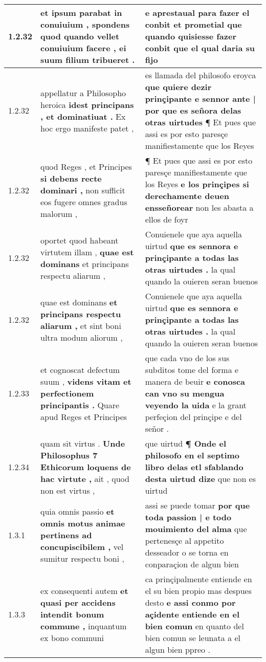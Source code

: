 \begin{tabular}{|p{1cm}|p{6.5cm}|p{6.5cm}|}
1.2.32 & et ipsum parabat in conuiuium , \textbf{ spondens quod quando vellet conuiuium facere , } ei suum filium tribueret . & e aprestaual para fazer el conbit \textbf{ et prometial que quando quisiesse fazer conbit } que el qual daria su fijo \\\hline
1.2.32 & appellatur a Philosopho heroica \textbf{ idest principans , et dominatiuat . } Ex hoc ergo manifeste patet , & es llamada del philosofo eroyca \textbf{ que quiere dezir prinçipante e sennor ante | por que es señora delas otras uirtudes } ¶ Et pues que assi es por esto paresçe manifiestamente que los Reyes \\\hline
1.2.32 & quod Reges , et Principes \textbf{ si debens recte dominari , } non sufficit eos fugere omnes gradus malorum , & ¶ Et pues que assi es por esto paresçe manifiestamente que los Reyes \textbf{ e los prinçipes si derechamente deuen ensseñorear } non les abasta a ellos de foyr \\\hline
1.2.32 & oportet quod habeant virtutem illam , \textbf{ quae est dominans } et principans respectu aliarum , & Conuienele que aya aquella uirtud \textbf{ que es sennora e prinçipante a todas las otras uirtudes . } la qual quando la ouieren seran buenos \\\hline
1.2.32 & quae est dominans \textbf{ et principans respectu aliarum , } et sint boni ultra modum aliorum , & Conuienele que aya aquella uirtud \textbf{ que es sennora e prinçipante a todas las otras uirtudes . } la qual quando la ouieren seran buenos \\\hline
1.2.33 & et cognoscat defectum suum , \textbf{ videns vitam et perfectionem principantis . } Quare apud Reges et Principes & que cada vno de los sus subditos tome del forma e manera de beuir \textbf{ e conosca can vno su mengua veyendo la uida } e la grant perfeçion del prinçipe e del señor . \\\hline
1.2.34 & quam sit virtus . \textbf{ Unde Philosophus 7 Ethicorum loquens de hac virtute , } ait , quod non est virtus , & que uirtud \textbf{ ¶ Onde el philosofo en el septimo libro delas etl sfablando desta uirtud dize } que non es uirtud \\\hline
1.3.1 & quia omnis passio \textbf{ et omnis motus animae pertinens ad concupiscibilem , } vel sumitur respectu boni , & assi se puede tomar \textbf{ por que toda passion | e todo mouimiento del alma } que pertenesçe al appetito desseador o se torna en conparaçion de algun bien \\\hline
1.3.3 & ex consequenti autem \textbf{ et quasi per accidens intendit bonum commune , } inquantum ex bono communi & ca prinçipalmente entiende en el su bien propio mas despues desto \textbf{ e assi conmo por açidente entiende en el bien comun } en quanto del bien comun se leunata a el algun bien ppreo . \\\hline

\end{tabular}
